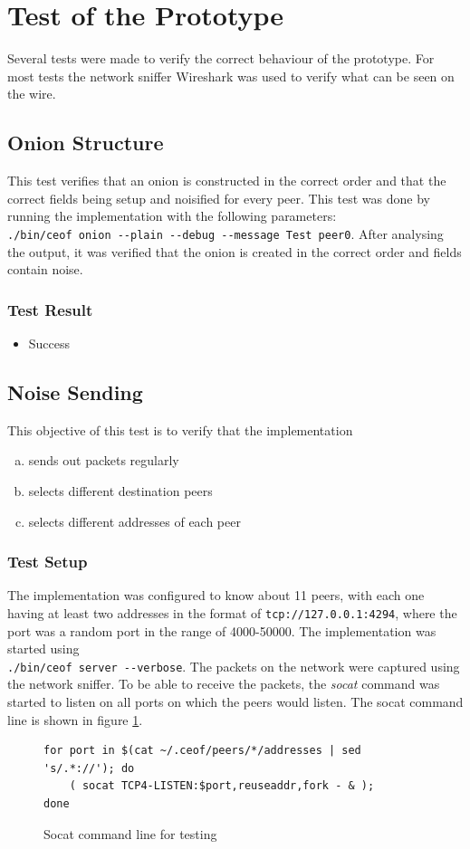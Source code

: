 \section{Test of the Prototype}
Several tests were made to verify the correct behaviour of the prototype.
For most tests the network sniffer Wireshark was used to verify what can be
seen on the wire.
\subsection{Onion Structure}
This test verifies that an onion is constructed in the correct order and that
the correct fields being setup and noisified for every peer.
This test was done by running the implementation with the following
parameters:\\ \verb=./bin/ceof onion --plain --debug --message Test peer0=.
After analysing the output, it was verified that the onion is created in the
correct order and fields contain noise.
\subsubsection{Test Result}
\begin{itemize}
\item Success
\end{itemize}
\subsection{Noise Sending}
\label{testnoisesending}
This objective of this test is to verify that the implementation
\begin{enumerate}[(a)]
\item sends out packets regularly 
\item selects different destination peers
\item selects different addresses of each peer
\end{enumerate}
\subsubsection{Test Setup}
The implementation was configured to know about 11 peers,
with each one having at least two addresses in the format
of \verb=tcp://127.0.0.1:4294=, where the port was a random
port in the range of 4000-50000.
The implementation was started using
\\ \verb=./bin/ceof server --verbose=. The packets
on the network were captured using the network sniffer.
To be able to receive the packets, the \textit{socat} command was started
to listen on all ports on which the peers would listen. The
socat command line is shown in figure \ref{socatlisten}.
\begin{figure}[htbp]
\caption{Socat command line for testing}
\label{socatlisten}
\begin{verbatim}
for port in $(cat ~/.ceof/peers/*/addresses | sed 's/.*://'); do
    ( socat TCP4-LISTEN:$port,reuseaddr,fork - & );
done
\end{verbatim}
\end{figure}
